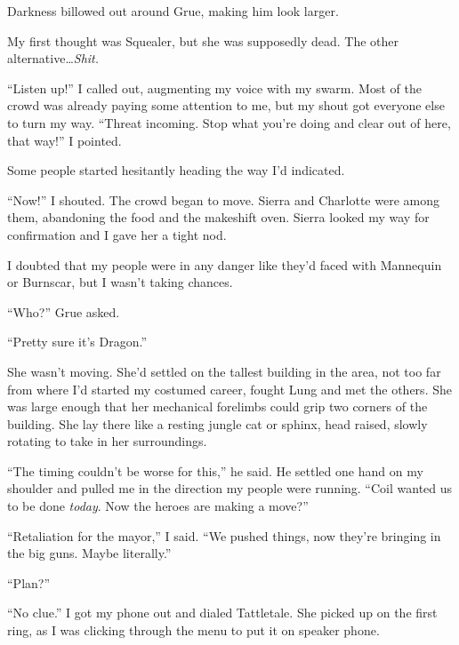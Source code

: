 Darkness billowed out around Grue, making him look larger.



My first thought was Squealer, but she was supposedly dead.  The other alternative\ldots \emph{Shit.}



``Listen up!''  I called out, augmenting my voice with my swarm.  Most of the crowd was already paying some attention to me, but my shout got everyone else to turn my way.  ``Threat incoming.  Stop what you're doing and clear out of here, that way!''  I pointed.



Some people started hesitantly heading the way I'd indicated.



``Now!''  I shouted.  The crowd began to move.  Sierra and Charlotte were among them, abandoning the food and the makeshift oven.  Sierra looked my way for confirmation and I gave her a tight nod.



I doubted that my people were in any danger like they'd faced with Mannequin or Burnscar, but I wasn't taking chances.



``Who?''  Grue asked.



``Pretty sure it's Dragon.''



She wasn't moving.  She'd settled on the tallest building in the area, not too far from where I'd started my costumed career, fought Lung and met the others.  She was large enough that her mechanical forelimbs could grip two corners of the building.  She lay there like a resting jungle cat or sphinx, head raised, slowly rotating to take in her surroundings.



``The timing couldn't be worse for this,'' he said.  He settled one hand on my shoulder and pulled me in the direction my people were running.  ``Coil wanted us to be done \emph{today}.  Now the heroes are making a move?''



``Retaliation for the mayor,'' I said.  ``We pushed things, now they're bringing in the big guns.  Maybe literally.''



``Plan?''



``No clue.''  I got my phone out and dialed Tattletale.  She picked up on the first ring, as I was clicking through the menu to put it on speaker phone.




